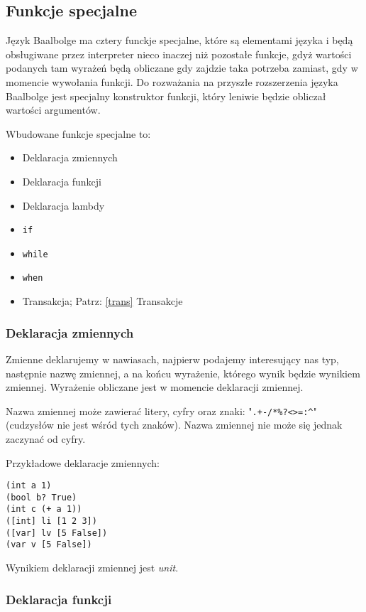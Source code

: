 \documentclass{article}
\begin{document}
\subsection{Funkcje specjalne}\label{func:special}

Język Baalbolge ma cztery funckje specjalne, które są elementami języka i będą obsługiwane przez interpreter nieco inaczej niż pozostałe funkcje, gdyż wartości podanych tam wyrażeń będą obliczane gdy zajdzie taka potrzeba zamiast, gdy w momencie wywołania funkcji. Do rozważania na przyszłe rozszerzenia języka Baalbolge jest specjalny konstruktor funkcji, który leniwie będzie obliczał wartości argumentów.

Wbudowane funkcje specjalne to:

\begin{itemize}
    \item Deklaracja zmiennych
    \item Deklaracja funkcji
    \item Deklaracja lambdy
    \item \texttt{if}
    \item \texttt{while}
    \item \texttt{when}
    \item Transakcja; Patrz: \ref{trans} Transakcje
\end{itemize}

\subsubsection{Deklaracja zmiennych}\label{var:decl}

Zmienne deklarujemy w nawiasach, najpierw podajemy interesujący nas typ, następnie nazwę zmiennej, a na końcu wyrażenie, którego wynik będzie wynikiem zmiennej. Wyrażenie obliczane jest w momencie deklaracji zmiennej.

Nazwa zmiennej może zawierać litery, cyfry oraz znaki: "\texttt{.+-/*\%?<>=:\^}" (cudzysłów nie jest wśród tych znaków). Nazwa zmiennej nie może się jednak zaczynać od cyfry.

Przykładowe deklaracje zmiennych:

\begin{lstlisting}
(int a 1)
(bool b? True)
(int c (+ a 1))
([int] li [1 2 3])
([var] lv [5 False])
(var v [5 False])
\end{lstlisting}

Wynikiem deklaracji zmiennej jest \textit{unit}.

\subsubsection{Deklaracja funkcji}\label{func:decl}
\end{document}
